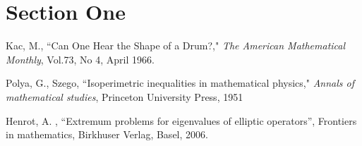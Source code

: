 \documentclass[12pt]{report}
\numberwithin{definition}{section}
\begin{document}
\section{Section One}



\begin{thebibliography}{100}
 \singlespacing
  Kac, M., ``Can One Hear the Shape of a Drum?," \emph{The American Mathematical Monthly}, Vol.73, No 4, April 1966.
 
  Polya, G., Szego, ``Isoperimetric inequalities in mathematical physics," \emph{Annals of mathematical studies}, Princeton University Press, 1951

  Henrot, A. , “Extremum problems for eigenvalues of elliptic operators”, Frontiers in mathematics, Birkhuser Verlag, Basel, 2006.
\end{thebibliography}



 
 
 
\end{document}
